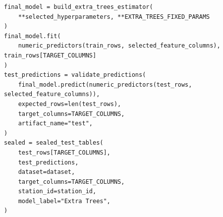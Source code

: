 \begin{verbatim}
final_model = build_extra_trees_estimator(
    **selected_hyperparameters, **EXTRA_TREES_FIXED_PARAMS
)
final_model.fit(
    numeric_predictors(train_rows, selected_feature_columns), train_rows[TARGET_COLUMNS]
)
test_predictions = validate_predictions(
    final_model.predict(numeric_predictors(test_rows, selected_feature_columns)),
    expected_rows=len(test_rows),
    target_columns=TARGET_COLUMNS,
    artifact_name="test",
)
sealed = sealed_test_tables(
    test_rows[TARGET_COLUMNS],
    test_predictions,
    dataset=dataset,
    target_columns=TARGET_COLUMNS,
    station_id=station_id,
    model_label="Extra Trees",
)
\end{verbatim}
